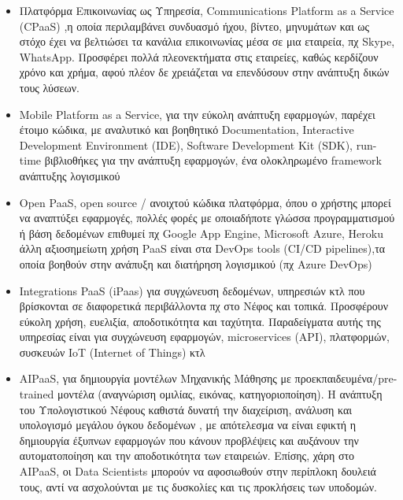 \documentclass{article}
\begin{document}
\begin{itemize}
\item Πλατφόρμα Επικοινωνίας ως Υπηρεσία, Communications Platform as a Service    (CPaaS) ,η οποία περιλαμβάνει συνδυασμό ήχου, βίντεο, μηνυμάτων και ως στόχο έχει να βελτιώσει τα κανάλια επικοινωνίας μέσα σε μια εταιρεία, πχ Skype, WhatsApp.
Προσφέρει πολλά πλεονεκτήματα στις εταιρείες, καθώς κερδίζουν χρόνο και χρήμα, αφού πλέον δε χρειάζεται να επενδύσουν στην ανάπτυξη δικών τους λύσεων.
\item {}Mobile Platform as a Service, για την εύκολη ανάπτυξη εφαρμογών, παρέχει έτοιμο κώδικα, με αναλυτικό και βοηθητικό Documentation, Interactive Development Environment (IDE), Software Development Kit (SDK), run-time βιβλιοθήκες για την ανάπτυξη εφαρμογών, ένα ολοκληρωμένο framework ανάπτυξης λογισμικού
\item Open PaaS, open source / ανοιχτού κώδικα πλατφόρμα, όπου ο χρήστης μπορεί να αναπτύξει εφαρμογές, πολλές φορές με οποιαδήποτε γλώσσα προγραμματισμού ή βάση δεδομένων επιθυμεί πχ Google App Engine, Microsoft Azure, Heroku
 άλλη αξιοσημείωτη χρήση  PaaS είναι στα DevOps tools (CI/CD pipelines),τα οποία βοηθούν στην ανάπυξη και διατήρηση λογισμικού (πχ Azure DevOps)
\item Integrations PaaS (iPaas) για συγχώνευση δεδομένων, υπηρεσιών κτλ που βρίσκονται σε διαφορετικά περιβάλλοντα πχ στο Νέφος και τοπικά. Προσφέρουν εύκολη χρήση, ευελιξία, αποδοτικότητα και ταχύτητα. Παραδείγματα αυτής της υπηρεσίας είναι για συγχώνευση εφαρμογών, microservices (API), πλατφορμών, συσκευών IoT (Internet of Things) κτλ 
\item {}AIPaaS, για δημιουργία μοντέλων Μηχανικής Μάθησης με προεκπαιδευμένα/pre-trained μοντέλα (αναγνώριση ομιλίας, εικόνας, κατηγοριοποίηση). Η ανάπτυξη του Υπολογιστικού Νέφους καθιστά δυνατή την διαχείριση, ανάλυση και υπολογισμό μεγάλου όγκου δεδομένων , με απότελεσμα να είναι εφικτή η δημιουργία έξυπνων εφαρμογών που κάνουν προβλέψεις και αυξάνουν την αυτοματοποίηση και την αποδοτικότητα των εταιρειών. Επίσης, χάρη στο AIPaaS, οι Data Scientists μπορούν να αφοσιωθούν στην περίπλοκη δουλειά τους, αντί να ασχολούνται με τις δυσκολίες και τις προκλήσεις των υποδομών.

\end{itemize}
\end{document}
